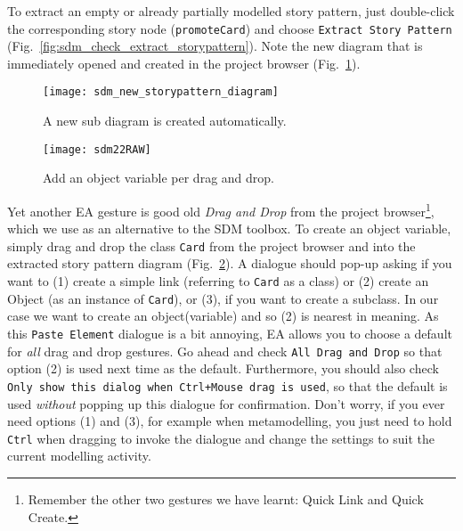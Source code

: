 To extract an empty or already partially modelled story pattern, just double-click the corresponding story node (\texttt{promoteCard}) and choose
\texttt{Extract Story Pattern} (Fig.~\ref{fig:sdm_check_extract_storypattern}). Note the new diagram that is immediately opened and created in the project
browser (Fig.~\ref{fig:sdm_new_sub_diagram}).

\begin{figure}[htbp]
\begin{center}
  \texttt{[image: sdm\_new\_storypattern\_diagram]}
  \caption{A new sub diagram is created automatically.}
  \label{fig:sdm_new_sub_diagram}
\end{center}
\end{figure}

\begin{figure}[htbp]
\begin{center}
  \texttt{[image: sdm22RAW]}
  \caption{Add an object variable per drag and drop.}
  \label{fig:sdm_check_bound_card}
\end{center}
\end{figure}

Yet another EA gesture is good old \emph{Drag and Drop} from the project  browser\footnote{Remember the other two gestures we have learnt:
Quick Link and Quick Create.}, which we use as an alternative to the SDM toolbox. To create an object variable, simply drag and drop the class \texttt{Card}
from the project browser and into the extracted story pattern diagram (Fig.~\ref{fig:sdm_check_bound_card}).  A dialogue should pop-up asking if you want to (1)
create a simple link (referring to \texttt{Card} as a class) or (2) create an Object (as an instance of \texttt{Card}), or (3), if you want to create a
subclass. In our case we want to create an object(variable) and so (2) is nearest in meaning. As this \texttt{Paste Element} dialogue is a bit annoying, EA 
allows you to choose a default for \emph{all} drag and drop gestures. Go ahead and check \texttt{All Drag and Drop} so that option (2) is used next time as the
default.  Furthermore, you should also check \texttt{Only show this dialog when Ctrl+Mouse drag is used}, so that the default is used \emph{without} popping up
this dialogue for confirmation. Don't worry, if you ever need options (1) and (3), for example when metamodelling, you  just need to hold \texttt{Ctrl} when
dragging to invoke the dialogue and change  the settings to suit the current modelling activity.

